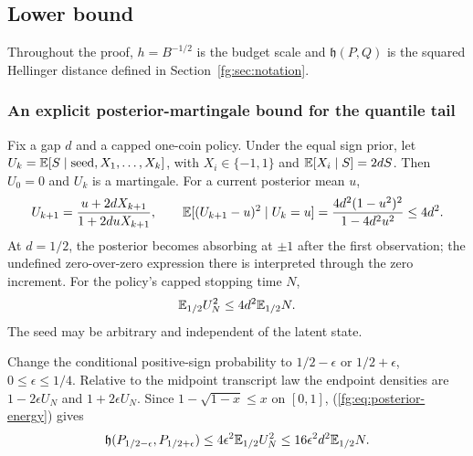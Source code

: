 \subsection{Lower bound}\label{fg:sec:matching-lower}
Throughout the proof, $h=B^{-1/2}$ is the budget scale and
$\mathfrak h(P,Q)$ is the squared Hellinger distance defined in
Section~\ref{fg:sec:notation}.

\subsubsection{An explicit posterior-martingale bound for the quantile tail}
Fix a gap $d$ and a capped one-coin policy. Under the equal sign prior,
let $U_k=\mathbb E[S\mid\text{seed},X_1,\ldots,X_k]$, with $X_i\in\{-1,1\}$
and $\mathbb E[X_i\mid S]=2dS$. Then $U_0=0$ and $U_k$ is a martingale.
For a current posterior mean $u$,
\[
 U_{k+1}=\frac{u+2dX_{k+1}}{1+2duX_{k+1}},\qquad
 \mathbb E[(U_{k+1}-u)^2\mid U_k=u]
 =\frac{4d^2(1-u^2)^2}{1-4d^2u^2}\le4d^2.
\]
At $d=1/2$, the posterior becomes absorbing at $\pm1$ after the first
observation; the undefined zero-over-zero expression there is interpreted
through the zero increment. For the policy's capped stopping time $N$,
\begin{equation}\label{fg:eq:posterior-energy}
                         \mathbb E_{1/2}U_N^2\le4d^2\mathbb E_{1/2}N.
\end{equation}
The seed may be arbitrary and independent of the latent state.

Change the conditional positive-sign probability to
$1/2-\epsilon$ or $1/2+\epsilon$, $0\le\epsilon\le1/4$.
Relative to the midpoint transcript law the endpoint densities are
$1-2\epsilon U_N$ and $1+2\epsilon U_N$.
Since $1-\sqrt{1-x}\le x$ on $[0,1]$, (\ref{fg:eq:posterior-energy}) gives
\begin{equation}\label{fg:eq:explicit-tail-local}
 \mathfrak h(P_{1/2-\epsilon},P_{1/2+\epsilon})
 \le4\epsilon^2\mathbb E_{1/2}U_N^2
 \le16\epsilon^2d^2\mathbb E_{1/2}N.
\end{equation}

